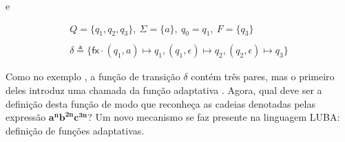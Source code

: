 \noindent e

	\begin{align*}
	Q = \{q_1, q_2, q_3\},\ \Sigma = \{a\},\ q_0 = q_1,\ F = \{q_3\} \\
	\\
	\delta \triangleq \{ \mathsf{fx}\cdot(q_1, a) \mapsto q_1,  (q_1, \epsilon) \mapsto q_2,  (q_2, \epsilon) \mapsto q_3 \} \tag{i}\label{d2-transicoes}
	\end{align*}

\noindent
Como no exemplo , a função de transição  $\delta$ contém três pares, mas o primeiro deles introduz uma chamada da função adaptativa . Agora, qual deve ser a definição desta função de modo que  reconheça as cadeias denotadas pelas expressão $\mathbf{a^nb^{2n}c^{3n}}$? Um novo mecanismo se faz presente na linguagem LUBA: definição de funções adaptativas.

